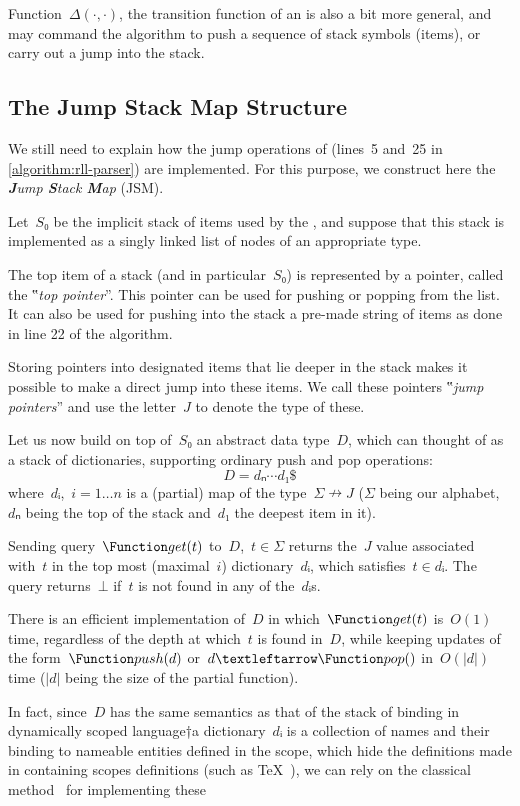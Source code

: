 Function~$Δ(·,·)$, the transition function of an \RLLp is also a bit more
general, and may command the algorithm to push a sequence of stack symbols
(items), or carry out a jump into the stack.

\subsection{The Jump Stack Map Structure}
\label{section:jump}
We still need to explain how the jump operations of \RLLp (lines~5
and~25 in \cref{algorithm:rll-parser}) are implemented. For this purpose, we
construct here the \emph{\textbf Jump \textbf Stack \textbf Map} (JSM).

Let~$S₀$ be the implicit stack of items used by the \RLLp, and suppose that
this stack is implemented as a singly linked list of nodes of an appropriate
type.

The top item of a stack (and in particular~$S₀$) is represented by a pointer,
called the ‟\emph{top pointer}”. This pointer can be used for pushing or
popping from the list. It can also be used for pushing into the stack a
pre-made string of items as done in line 22 of the \RLLp algorithm.

Storing pointers into designated items that lie deeper in the stack makes it
possible to make a direct jump into these items. We call these pointers
‟\emph{jump pointers}” and use the letter~$J$ to denote the type of these.

Let us now build on top of~$S₀$ an abstract data type~$D$, which can thought of
as a stack of dictionaries, supporting ordinary push and pop operations:
\[
  D=dₙ⋯d₁\$
\]
where~$dᵢ$,~$i=1…n$ is a (partial) map of the type~$Σ↛J$ ($Σ$ being our
alphabet,~$dₙ$ being the top of the stack and~$d₁$ the deepest item in it).

Sending query~$\Function get(t)$ to~$D$,~$t∈Σ$ returns the~$J$ value
associated with~$t$ in the top most (maximal~$i$) dictionary~$dᵢ$, which
satisfies~$t∈dᵢ$. The query returns~$⊥$ if~$t$ is not found in any of
the~$dᵢ$s.

There is an efficient implementation of~$D$ in which~$\Function get(t)$
is~$O(1)$ time, regardless of the depth at which~$t$ is found in~$D$, while
keeping updates of the form~$\Function push(d)$ or~$d←\Function pop()$
in~$O(|d|)$ time ($|d|$ being the size of the partial function).

In fact, since~$D$ has the same semantics as that of the stack of binding in
dynamically scoped language†{a dictionary~$dᵢ$ is a collection of
  names and their binding to nameable entities defined in the scope, which hide
the definitions made in containing scopes} definitions (such as
\TeX~\cite{TeX:79}), we can rely on the classical method~\cite{Schoe:95} for
implementing these

